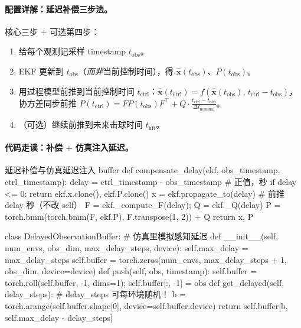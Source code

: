 \paragraph{配置详解：延迟补偿三步法。}核心三步 $+$ 可选第四步：

\begin{enumerate}
  \item 给每个观测记采样 timestamp $t_{\text{obs}}$。
  \item EKF 更新到 $t_{\text{obs}}$（\emph{而非}当前控制时间），得 $\hat{\mathbf x}(t_{\text{obs}})$、$P(t_{\text{obs}})$。
  \item 用过程模型前推到当前控制时间 $t_{\text{ctrl}}$：$\hat{\mathbf x}(t_{\text{ctrl}})=f(\hat{\mathbf x}(t_{\text{obs}}),\,t_{\text{ctrl}}-t_{\text{obs}})$，协方差同步前推 $P(t_{\text{ctrl}})=FP(t_{\text{obs}})F^{\!\top}+Q\cdot\frac{t_{\text{ctrl}}-t_{\text{obs}}}{\Delta t_{\text{nominal}}}$。
  \item （可选）继续前推到未来击球时间 $t_{\text{hit}}$。
\end{enumerate}

\paragraph{代码走读：补偿 $+$ 仿真注入延迟。}

\begin{codebox}[Python]{延迟补偿与仿真延迟注入 buffer}
def compensate_delay(ekf, obs_timestamp, ctrl_timestamp):
    delay = ctrl_timestamp - obs_timestamp                  # 正值，秒
    if delay <= 0:
        return ekf.x.clone(), ekf.P.clone()
    x = ekf.propagate_to(delay)                             # 前推 delay 秒（不改 self）
    F = ekf._compute_F(delay); Q = ekf._Q(delay)
    P = torch.bmm(torch.bmm(F, ekf.P), F.transpose(1, 2)) + Q
    return x, P

class DelayedObservationBuffer:                            # 仿真里模拟感知延迟
    def __init__(self, num_envs, obs_dim, max_delay_steps, device):
        self.max_delay = max_delay_steps
        self.buffer = torch.zeros(num_envs, max_delay_steps + 1, obs_dim, device=device)
    def push(self, obs, timestamp):
        self.buffer = torch.roll(self.buffer, -1, dims=1); self.buffer[:, -1] = obs
    def get_delayed(self, delay_steps):                    # delay_steps 可每环境随机！
        b = torch.arange(self.buffer.shape[0], device=self.buffer.device)
        return self.buffer[b, self.max_delay - delay_steps]
\end{codebox}

